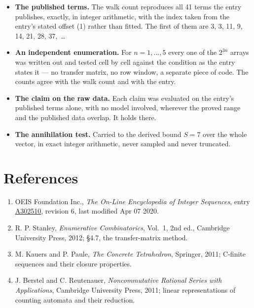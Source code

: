 \documentclass[11pt]{article}
\theoremstyle{definition}
\begin{document}
\begin{itemize}

\item {\bfseries The published terms.} The walk count reproduces all 41 terms the entry publishes, exactly, in integer arithmetic, with the index taken from the entry's stated offset (1) rather than fitted. The first of them are 3, 3, 11, 9, 14, 21, 28, 37,~\dots

\item {\bfseries An independent enumeration.} For $n = 1,\dots,5$ every one of the $2^{3n}$ arrays was written out and tested cell by cell against the condition as the entry states it --- no transfer matrix, no row window, a separate piece of code. The counts agree with the walk count and with the entry.

\item {\bfseries The claim on the raw data.} Each claim was evaluated on the entry's published terms alone, with no model involved, wherever the proved range and the published data overlap. It holds there.

\item {\bfseries The annihilation test.} Carried to the derived bound $S = 7$ over the whole vector, in exact integer arithmetic, never sampled and never truncated.

\end{itemize}

\section{References}

\begin{enumerate}

\item OEIS Foundation Inc., \emph{The On-Line Encyclopedia of Integer Sequences}, entry \href{https://oeis.org/A302510}{A302510}, revision 6, last modified Apr 07 2020.

\item R. P. Stanley, \emph{Enumerative Combinatorics}, Vol.~1, 2nd ed., Cambridge University Press, 2012; \S4.7, the transfer-matrix method.

\item M. Kauers and P. Paule, \emph{The Concrete Tetrahedron}, Springer, 2011; C-finite sequences and their closure properties.

\item J. Berstel and C. Reutenauer, \emph{Noncommutative Rational Series with Applications}, Cambridge University Press, 2011; linear representations of counting automata and their reduction.

\end{enumerate}
\end{document}
